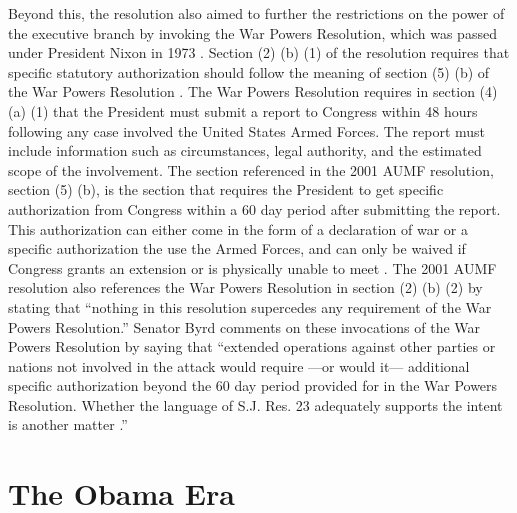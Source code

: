 \documentclass[12pt]{article}
\begin{document}
Beyond this, the resolution also aimed to further the restrictions on the power of the executive branch by invoking the War Powers Resolution, which was passed under President Nixon in 1973 \autocite{zotero-176}.
Section (2) (b) (1) of the resolution requires that specific statutory authorization should follow the meaning of section (5) (b) of the War Powers Resolution \autocite{daschle2001}.
The War Powers Resolution requires in section (4) (a) (1) that the President must submit a report to Congress within 48 hours following any case involved the United States Armed Forces.
The report must include information such as circumstances, legal authority, and the estimated scope of the involvement.
The section referenced in the 2001 AUMF resolution, section (5) (b), is the section that requires the President to get specific authorization from Congress within a 60 day period after submitting the report.
This authorization can either come in the form of a declaration of war or a specific authorization the use the Armed Forces, and can only be waived if Congress grants an extension or is physically unable to meet \autocite{zablocki1973}.
The 2001 AUMF resolution also references the War Powers Resolution in section (2) (b) (2) by stating that ``nothing in this resolution supercedes any requirement of the War Powers Resolution.''
Senator Byrd comments on these invocations of the War Powers Resolution by saying that ``extended operations against other parties or nations not involved in the attack would require —or would it— additional specific authorization beyond the 60 day period provided for in the War Powers Resolution. Whether the language of S.J. Res. 23 adequately supports the intent is another matter \autocite[SS950]{byrd2001a}.''

\section*{The Obama Era}
\end{document}
